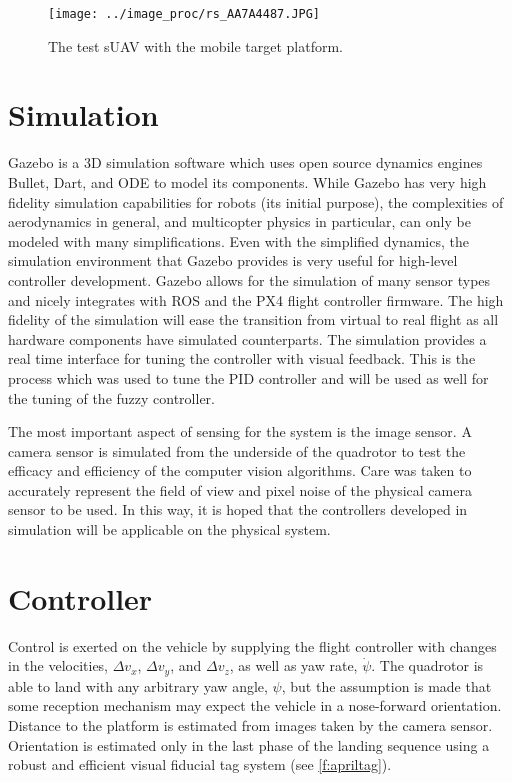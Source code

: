 \documentclass[]{aiaa-tc}
\begin{document}
\begin{figure}[h]
\centering
\texttt{[image: ../image\_proc/rs\_AA7A4487.JPG]}
\caption{The test sUAV with the mobile target platform.}\label{f:lezl-olli}
\end{figure}

\section{Simulation}
Gazebo is a 3D simulation software which uses open source dynamics engines Bullet, Dart, and ODE to model its components. While Gazebo has very high fidelity simulation capabilities for robots (its initial purpose), the complexities of aerodynamics in general, and multicopter physics in particular, can only be modeled with many simplifications. Even with the simplified dynamics, the simulation environment that Gazebo provides is very useful for high-level controller development. Gazebo allows for the simulation of many sensor types and nicely integrates with ROS and the PX4 flight controller firmware. The high fidelity of the simulation will ease the transition from virtual to real flight as all hardware components have simulated counterparts. The simulation provides a real time interface for tuning the controller with visual feedback. This is the process which was used to tune the PID controller and will be used as well for the tuning of the fuzzy controller.

The most important aspect of sensing for the system is the image sensor. A camera sensor is simulated from the underside of the quadrotor to test the efficacy and efficiency of the computer vision algorithms. Care was taken to accurately represent the field of view and pixel noise of the physical camera sensor to be used. In this way, it is hoped that the controllers developed in simulation will be applicable on the physical system.

\section{Controller}
Control is exerted on the vehicle by supplying the flight controller with changes in the velocities, $\Delta v_x$, $\Delta v_y$, and $\Delta v_z$, as well as yaw rate, $\dot{\psi}$. The quadrotor is able to land with any arbitrary yaw angle, $\psi$, but the assumption is made that some reception mechanism may expect the vehicle in a nose-forward orientation. Distance to the platform is estimated from images taken by the camera sensor. Orientation is estimated only in the last phase of the landing sequence using a robust and efficient visual fiducial tag system\cite{olson2011tags} (see \cref{f:apriltag}).
\end{document}
